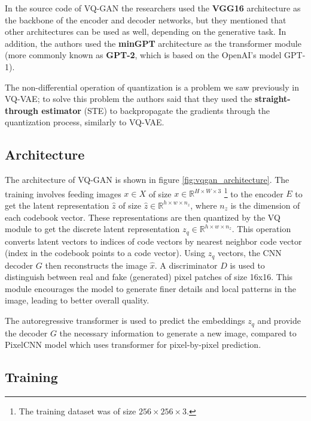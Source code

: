 In the source code of VQ-GAN the researchers used the \textbf{VGG16} \cite{vgg16} architecture as the backbone of the encoder and decoder networks, but they mentioned that other architectures can be used as well, depending on the generative task. In addition, the authors used the \textbf{minGPT} \cite{mingpt} architecture as the transformer module (more commonly known as \textbf{GPT-2}, which is based on the OpenAI's model GPT-1).

The non-differential operation of quantization is a problem we saw previously in VQ-VAE; to solve this problem the authors said that they used the \textbf{straight-through estimator} (STE) \cite{ste} to backpropagate the gradients through the quantization process, similarly to VQ-VAE.






\subsection{Architecture}

The architecture of VQ-GAN is shown in figure \ref{fig:vqgan_architecture}. The training involves feeding images $x \in X$ of size $x \in \mathbb{R}^{H \times W \times 3}$ \footnote[2]{The training dataset was of size $256 \times 256 \times 3$.} to the encoder $E$ to get the latent representation $\hat{z}$ of size $\hat{z} \in \mathbb{R}^{h \times w \times n_z}$, where $n_z$ is the dimension of each codebook vector. These representations are then quantized by the VQ module to get the discrete latent representation $z_q \in \mathbb{R}^{h \times w \times n_z}$. This operation converts latent vectors to indices of code vectors by nearest neighbor code vector (index in the codebook points to a code vector). Using $z_q$ vectors, the CNN decoder $G$ then reconstructs the image $\hat{x}$. A discriminator $D$ is used to distinguish between real and fake (generated) pixel patches of size 16x16. This module encourages the model to generate finer details and local patterns in the image, leading to better overall quality.

The autoregressive transformer is used to predict the embeddings $z_q$ and provide the decoder $G$ the necessary information to generate a new image, compared to PixelCNN model \cite{pixelcnn} which uses transformer for pixel-by-pixel prediction.




\subsection{Training}

